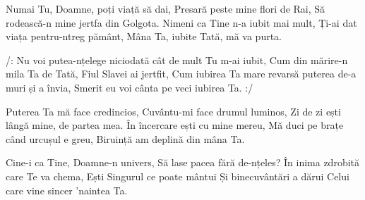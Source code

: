 \beginverse
Numai Tu, Doamne, poți viață să dai,
Presară peste mine flori de Rai,
Să rodească-n mine jertfa din Golgota.
Nimeni ca Tine n-a iubit mai mult,
Ți-ai dat viața pentru-ntreg pământ,
Mâna Ta, iubite Tată, mă va purta.
\endverse

\beginchorus
/: Nu voi putea-nțelege niciodată cât de mult Tu m-ai iubit,
Cum din mărire-n mila Ta de Tată, Fiul Slavei ai jertfit,
Cum iubirea Ta mare revarsă puterea de-a muri și a învia,
Smerit eu voi cânta pe veci iubirea Ta. :/
\endchorus

\beginverse
Puterea Ta mă face credincios,
Cuvântu-mi face drumul luminos,
Zi de zi ești lângă mine, de partea mea.
În încercare ești cu mine mereu,
Mă duci pe brațe când urcușul e greu,
Biruință am deplină din mâna Ta.
\endverse

\beginverse
Cine-i ca Tine, Doamne-n univers,
Să lase pacea fără de-nțeles?
În inima zdrobită care Te va chema,
Ești Singurul ce poate mântui
Și binecuvântări a dărui
Celui care vine sincer ’naintea Ta.
\endverse
\endsong